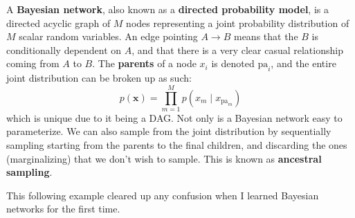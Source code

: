   \begin{definition}  
    A \textbf{Bayesian network}, also known as a \textbf{directed probability model}, is a directed acyclic graph of $M$ nodes representing a joint probability distribution of $M$ scalar random variables. An edge pointing $A \rightarrow B$ means that the $B$ is conditionally dependent on $A$, and that there is a very clear casual relationship coming from $A$ to $B$. The \textbf{parents} of a node $x_i$ is denoted $\mathrm{pa}_i$, and the entire joint distribution can be broken up as such: 
    \begin{equation}
      p(\mathbf{x}) = \prod_{m=1}^M p(x_m \mid x_{\mathrm{pa}_m})
    \end{equation}
    which is unique due to it being a DAG. Not only is a Bayesian network easy to parameterize. We can also sample from the joint distribution by sequentially sampling starting from the parents to the final children, and discarding the ones (marginalizing) that we don't wish to sample. This is known as \textbf{ancestral sampling}. 

    \begin{figure}[H]
      \centering 
      \caption{} 
      \label{fig:bayesian_network}
    \end{figure}
  \end{definition}

  This following example cleared up any confusion when I learned Bayesian networks for the first time. 

